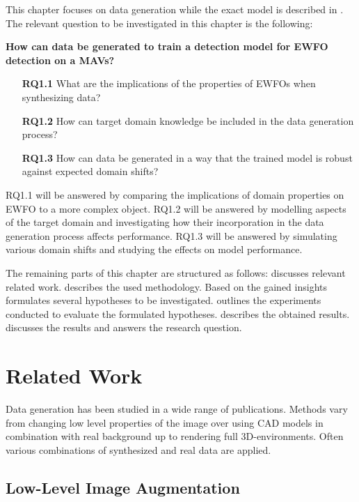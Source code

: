 This chapter focuses on data generation while the exact model is described in .
The relevant question to be investigated in this chapter is the following:

\textbf{How can data be generated to train a detection model for \ac{EWFO} detection on a \acp{MAV}?}

\begin{enumerate}
	\item[\textbf{RQ1.1}]What are the implications of the properties of \acp{EWFO} when synthesizing data?
	\item[\textbf{RQ1.2}]How can target domain knowledge be included in the data generation process?
	\item[\textbf{RQ1.3}]How can data be generated in a way that the trained model is robust against expected domain shifts?
\end{enumerate}

RQ1.1 will be answered by comparing the implications of domain properties on \ac{EWFO} to a more complex object. RQ1.2 will be answered by modelling aspects of the target domain and investigating how their incorporation in the data generation process affects performance. RQ1.3 will be answered by simulating various domain shifts and studying the effects on model performance.

The remaining parts of this chapter are structured as follows:  discusses relevant related work.  describes the used methodology. Based on the gained insights  formulates several hypotheses to be investigated.  outlines the experiments conducted to evaluate the formulated hypotheses.  describes the obtained results.  discusses the results and  answers the research question.

\section{Related Work}
\label{sec:training:related}

Data generation has been studied in a wide range of publications. Methods vary from changing low level properties of the image over using CAD models in combination with real background up to rendering full 3D-environments. Often various combinations of synthesized and real data are applied. 

\subsection{Low-Level Image Augmentation}

